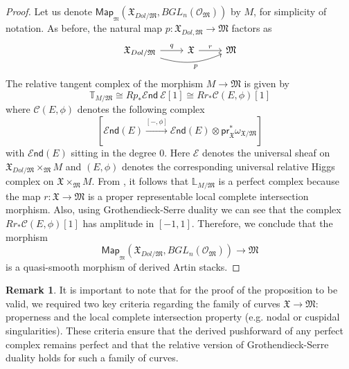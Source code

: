 \documentclass[11pt]{amsart}
\newcommand {\End} {\mathcal E\mathsf{nd}}
\newcommand {\map} {\mathsf{Map}}
\theoremstyle{plain}
\numberwithin{equation}{section}
\theoremstyle{definition}
\newtheorem{Rem}[Def]{Remark}
\theoremstyle{plain}
\begin{document}
\begin{proof}
Let us denote $\map_{_{\mathfrak M}}(\mathfrak{X}_{Dol/\mathfrak{M}}, BGL_n(\mathcal{O}_{\mathfrak{M}}))$ by $M$, for simplicity of notation. As before, the natural map $p : \mathfrak{X}_{Dol,\mathfrak{M}} \to \mathfrak{M}$ factors as 
\begin{equation} \label{eq:XDolM}
\begin{tikzcd}
\mathfrak{X}_{Dol/\mathfrak{M}}\arrow["q"]{r}\arrow[bend right=20,swap, "p"]{rr}  & \mathfrak{X} \arrow["r"]{r} & \mathfrak{M}
\end{tikzcd}
\end{equation}
The relative tangent complex of the morphism $M\longrightarrow \mathfrak M$ is given by 
\begin{equation}
\mathbb T_{M/\mathfrak M}\cong  Rp_*\End ~\mathcal E[1]\cong   Rr_*\mathcal C(E, \phi)[1]
\end{equation}
where $\mathcal C(E, \phi)$ denotes the following complex
\begin{equation}\label{TC113}
\left[ \End (E)\xrightarrow{[-, \phi]} \End (E)\otimes \mathsf{pr}_{\mathfrak{X}}^{*}\omega_{\mathfrak{X}/\mathfrak{M}}
\right]
\end{equation} 
with $\End (E)$ sitting in the degree $0$. Here $\mathcal E$ denotes the universal sheaf on \linebreak $\mathfrak{X}_{Dol/\mathfrak{M}}\times_{\mathfrak{M}} M$ and $(E, \phi)$ denotes the corresponding universal relative Higgs complex on $\mathfrak{X}\times_{\mathfrak{M}} M$. From \cite[Theorem 0.3]{To}, it follows that $\mathbb L_{M/\mathfrak M}$ is a perfect complex because the map $r: \mathfrak{X} \longrightarrow \mathfrak{M}$ is a proper representable local complete intersection morphism. Also, using Grothendieck-Serre duality we can see that the complex $Rr_*\mathcal C(E, \phi)[1]$ has amplitude in $[-1, 1]$. Therefore, we conclude that the morphism 
\[
\map_{_{\mathfrak M}}(\mathfrak{X}_{Dol/\mathfrak{M}}, BGL_n(\mathcal{O}_{\mathfrak M}))\longrightarrow \mathfrak M
\] is a quasi-smooth morphism of derived Artin stacks.
\end{proof}
\smallskip


\begin{Rem}
    It is important to note that for the proof of the proposition to be valid, we required two key criteria regarding the family of curves $\mathfrak{X} \to \mathfrak{M}$: properness and the local complete intersection property (e.g. nodal or cuspidal singularities). These criteria ensure that the derived pushforward of any perfect complex remains perfect and that the relative version of Grothendieck-Serre duality holds for such a family of curves. 
\end{Rem}
\end{document}
